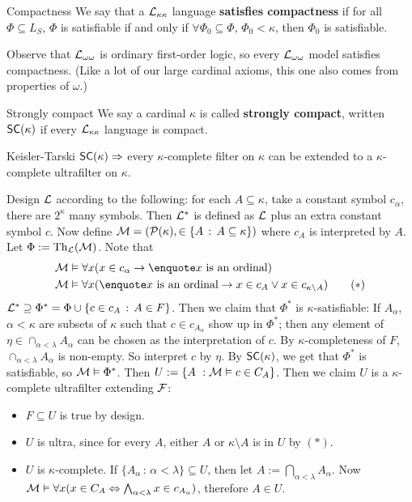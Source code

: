 \documentclass{article}
\begin{document}
\begin{fancydefine}{Compactness}
    We say that a $\mathcal{L}_{\kappa \kappa}$ language \textbf{satisfies compactness} if for all $\Phi \subseteq L_{S}$, $\Phi$ is satisfiable if and only if $\forall \Phi_{0} \subseteq \Phi$, $\Phi_{0}< \kappa$, then $\Phi_{0}$ is satisfiable.
\end{fancydefine}
Observe that $\mathcal{L}_{\omega \omega}$ is ordinary first-order logic, so every $\mathcal{L}_{\omega \omega}$ model satisfies compactness. (Like a lot of our large cardinal axioms, this one also comes from properties of $\omega$.)
\begin{fancydefine}{Strongly compact}
    We say a cardinal $\kappa$ is called \textbf{strongly compact}, written $\mathsf{SC}(\kappa)$ if every $\mathcal{L}_{\kappa \kappa}$ language is compact.
\end{fancydefine}
\begin{fancythm}{Keisler-Tarski}
    $\mathsf{SC}(\kappa) \Rightarrow$ every $\kappa$-complete filter on $\kappa$ can be extended to a $\kappa$-complete ultrafilter on $\kappa$.
\end{fancythm}
\proof Design $\mathcal{L}$ according to the following: for each $A \subseteq \kappa$, take a constant symbol $c_{\alpha}$, there are $2^{\kappa}$ many symbols. Then $\mathcal{L}^{*}$ is defined as $\mathcal{L}$ plus an extra constant symbol $c$. Now define $\mathcal{M} = (\mathcal{P}(\kappa), \in \{A\, : \, A \subseteq \kappa\})$ where $c_{A}$ is interpreted by $A$. Let $\Phi := \operatorname{Th}_{\mathcal{L}}(\mathcal{M})$. Note that \begin{align*} 
    \calM &\models \forall x ( x \in c_{\alpha} \rightarrow \text{\say{$x$ is an ordinal}})\\
    \calM &\models \forall x ( \text{\say{$x$ is an ordinal}} \rightarrow x \in c_{A} \vee x \in c_{\kappa \setminus A}) \tag{$*$}
\end{align*}
$\mathcal{L}^{*} \supseteq \Phi^{*} = \Phi \cup \{ c \in c_{A} \, : \, A \in F\}$. Then we claim that $\Phi^{*}$ is $\kappa$-satisfiable: If $A_{\alpha}$, $\alpha < \kappa$ are subsets of $\kappa$ such that $c \in c_{A_{\alpha}}$ show up in $\Phi^{*}$; then any element of $\eta \in \cap_{\alpha < \lambda} A_{\alpha}$ can be chosen as the interpretation of $c$. By $\kappa$-completeness of $F$, $\cap_{\alpha < \lambda} A_{\alpha}$ is non-empty. So interpret $c$ by $\eta$. By $\mathsf{SC}(\kappa)$, we get that $\Phi^{*}$ is satisfiable, so $\mathcal{M} \vDash \Phi^{*}$. Then $U := \{ A \ : \mathcal{M} \vDash c \in C_{A}\}$. Then we claim $U$ is a $\kappa$-complete ultrafilter extending $\mathcal{F}$: \begin{itemize}
    \item $F \subseteq U$ is true by design.
    \item $U$ is ultra, since for every $A$, either $A$ or $\kappa \setminus A$ is in $U$ by $(*)$.
    \item  $U$ is $\kappa$-complete. If $\{A_{\alpha} \, : \, \alpha < \lambda\} \subseteq U$, then let $A := \bigcap_{\alpha<\lambda} A_{\alpha}$. Now $\mathcal{M} \vDash \forall x (x \in C_{A} \Leftrightarrow \bigwedge_{\alpha <\lambda} x \in c_{A_{\alpha}})$, therefore $A \in U$.
\end{itemize}
\end{document}
